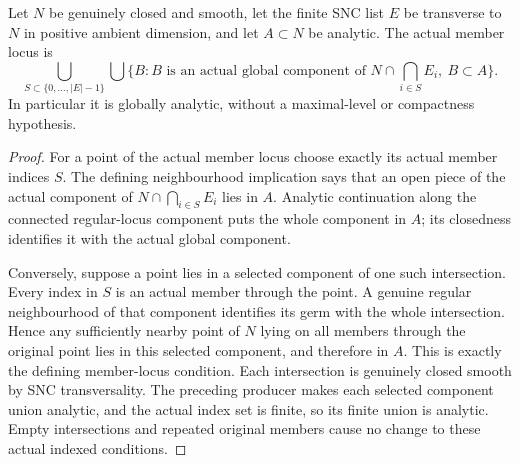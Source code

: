 \begin{theorem}
\label{hir:member-inter-locus-analytic-components}
\leanok
Let $N$ be genuinely closed and smooth, let the finite SNC list $E$ be
transverse to $N$ in positive ambient dimension, and let $A\subset N$
be analytic. The actual member locus is
\[
 \bigcup_{S\subset\{0,\ldots,|E|-1\}}
 \bigcup\{B:B\text{ is an actual global component of }
 N\cap\bigcap_{i\in S}E_i,\ B\subset A\}.
\]
In particular it is globally analytic, without a maximal-level or
compactness hypothesis.
\end{theorem}
\begin{proof}
For a point of the actual member locus choose exactly its actual member
indices $S$. The defining neighbourhood implication says that an open
piece of the actual component of $N\cap\bigcap_{i\in S}E_i$ lies in
$A$. Analytic continuation along the connected regular-locus component
puts the whole component in $A$; its closedness identifies it with the
actual global component.

Conversely, suppose a point lies in a selected component of one such
intersection. Every index in $S$ is an actual member through the point.
A genuine regular neighbourhood of that component identifies its germ
with the whole intersection. Hence any sufficiently nearby point of
$N$ lying on all members through the original point lies in this
selected component, and therefore in $A$. This is exactly the defining
member-locus condition. Each intersection is genuinely closed smooth
by SNC transversality. The preceding producer makes each selected
component union analytic, and the actual index set is finite, so its
finite union is analytic. Empty intersections and repeated original
members cause no change to these actual indexed conditions.
\end{proof}

